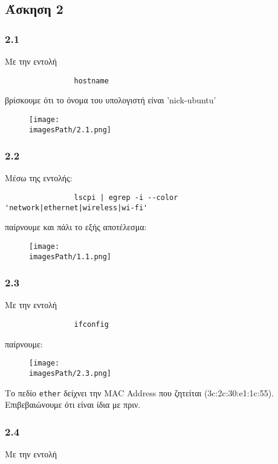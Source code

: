 	\subsection*{Άσκηση 2}
	
		\subsubsection*{2.1}
			Με την εντολή 
			\begin{verbatim}
				hostname
			\end{verbatim}
			
			βρίσκουμε ότι το όνομα του υπολογιστή είναι 'nick-ubuntu'
			
			\begin{figure}[H]
				\texttt{[image: \\imagesPath/2.1.png]}
			\end{figure}
			
		\subsubsection*{2.2}
			Μέσω της εντολής:
			\begin{verbatim}
				lscpi | egrep -i --color 'network|ethernet|wireless|wi-fi'
			\end{verbatim}
			
			παίρνουμε και πάλι το εξής αποτέλεσμα: 
			
			\begin{figure}[H]
				\texttt{[image: \\imagesPath/1.1.png]}
			\end{figure}
		
		\subsubsection*{2.3}
			Με την εντολή 
			\begin{verbatim}
				ifconfig
			\end{verbatim}
			
			παίρνουμε:
			
			\begin{figure}[H]
				\texttt{[image: \\imagesPath/2.3.png]}
			\end{figure}
		
			Tο πεδίο \verb|ether| δείχνει την MAC Address που ζητείται (3c:2c:30:e1:1c:55). Επιβεβαιώνουμε ότι είναι ίδια με πριν.
		
		\subsubsection*{2.4}
			Με την εντολή 
			

